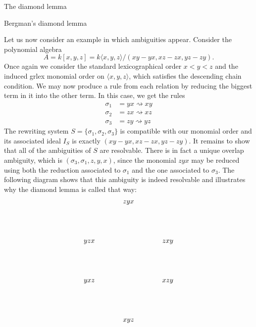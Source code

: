 \begin{chapter}{The diamond lemma}
\begin{section}{Bergman's diamond lemma}
\begin{exmp}
\end{exmp}
\begin{exmp} Let us now consider an example in which ambiguities appear. Consider the polynomial algebra \[A=k[x,y,z]=k\langle x,y,z\rangle/(xy-yx, xz-zx, yz-zy).\]
Once again we consider the standard lexicographical order $x<y<z$ and the induced grlex monomial order on $\langle x,y,z\rangle$, which satisfies the descending chain condition. We may now produce a rule from each relation by reducing the biggest term in it into the other term. In this case, we get the rules
\begin{align*}
\sigma_1 &= yx \rightsquigarrow xy\\
\sigma_2 &= zx \rightsquigarrow xz\\
\sigma_3 &= zy \rightsquigarrow yz
\end{align*}
The rewriting system $S=\{\sigma_1, \sigma_2, \sigma_3\}$ is compatible with our monomial order and its associated ideal $I_S$ is exactly $(xy-yx, xz-zx, yz-zy)$. It remains to show that all of the ambiguities of $S$ are resolvable. There is in fact a unique overlap ambiguity, which is $(\sigma_3, \sigma_1, z, y, x)$, since the monomial $zyx$ may be reduced using both the reduction associated to $\sigma_1$ and the one associated to $\sigma_3$. The following diagram shows that this ambiguity is indeed resolvable and illustrates why the diamond lemma is called that way:
\[
\begin{tikzpicture}
\node (1) at (0,0) {$zyx$};
\node (a1) at (-2,-2) {$yzx$};
\node (a2) at (2,-2) {$zxy$};
\node (b1) at (-2,-4) {$yxz$};
\node (b2) at (2,-4) {$xzy$};
\node (c) at (0,-6) {$xyz$};


\end{tikzpicture}\]
\end{exmp}
\end{section}
\end{chapter}
